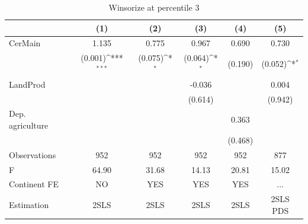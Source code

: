 \begin{table}[htbp]\centering
\def\sym#1{\ifmmode^{#1}\else\(^{#1}\)\fi}
\caption{Winsorize at percentile 3}
\begin{tabular}{l*{5}{c}}
\hline\hline
                &\multicolumn{1}{c}{(1)}         &\multicolumn{1}{c}{(2)}         &\multicolumn{1}{c}{(3)}         &\multicolumn{1}{c}{(4)}         &\multicolumn{1}{c}{(5)}         \\
\hline
CerMain         &    1.135         &    0.775         &    0.967         &    0.690         &    0.730         \\
                &  (0.001)\sym{***}&  (0.075)\sym{*}  &  (0.064)\sym{*}  &  (0.190)         &  (0.052)\sym{*}  \\
LandProd        &                  &                  &   -0.036         &                  &    0.004         \\
                &                  &                  &  (0.614)         &                  &  (0.942)         \\
Dep. agriculture&                  &                  &                  &    0.363         &                  \\
                &                  &                  &                  &  (0.468)         &                  \\
\hline
Observations    &      952         &      952         &      952         &      952         &      877         \\
F               &    64.90         &    31.68         &    14.13         &    20.81         &    15.02         \\
Continent FE    &       NO         &      YES         &      YES         &      YES         &      ...         \\
Estimation      &     2SLS         &     2SLS         &     2SLS         &     2SLS         & 2SLS PDS         \\
\hline\hline
\end{tabular}
\end{table}
